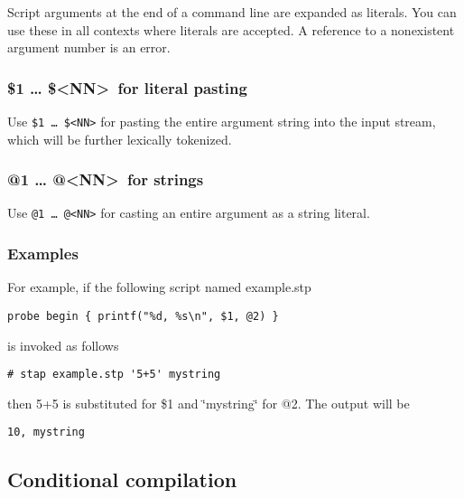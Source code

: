\documentclass[twoside,english]{article}
\newenvironment{vindent}
{\begin{list}{}{\setlength{\listparindent}{6pt}}
\item[]}
{\end{list}}
\begin{document}
Script arguments at the end of a command line are expanded as literals. You
can use these in all contexts where literals are accepted. A reference to
a nonexistent argument number is an error.


\subsubsection{\$1 \ldots{} \$\textless NN\textgreater\ for literal pasting}
\index{\$}
Use \texttt{\$1 \ldots{} \$<NN>} for pasting the entire argument string 
into the input stream, which will be further lexically tokenized.

\subsubsection{@1 \ldots{} @\textless NN\textgreater\ for strings}

Use \texttt{@1 \ldots{} @<NN>} for casting an entire argument
as a string literal.

\subsubsection{Examples}

For example, if the following script named example.stp

\begin{vindent}
\begin{verbatim}
probe begin { printf("%d, %s\n", $1, @2) }
\end{verbatim}
\end{vindent}
is invoked as follows

\begin{vindent}
\begin{verbatim}
# stap example.stp '5+5' mystring
\end{verbatim}
\end{vindent}
then 5+5 is substituted for \$1 and \char`\"{}mystring\char`\"{} for @2. The
output will be

\begin{vindent}
\begin{verbatim}
10, mystring
\end{verbatim}
\end{vindent}


\subsection{Conditional compilation}
\end{document}
